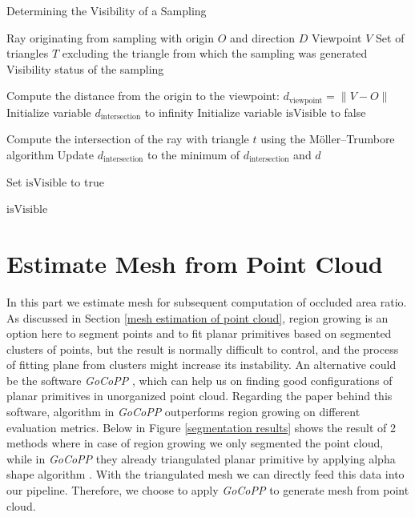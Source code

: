 \documentclass[11pt, a4paper,oneside,chapterprefix=false]{scrbook}
\begin{document}
\begin{algorithm}[H]
\caption{Determining the Visibility of a Sampling}\label{alg:visibility_sampling}
\begin{algorithmic}
\Require Ray originating from sampling with origin \( O \) and direction \( D \)
\Require Viewpoint \( V \)
\Require Set of triangles \( T \) excluding the triangle from which the sampling was generated
\Ensure Visibility status of the sampling

\State Compute the distance from the origin to the viewpoint: \( d_{\text{viewpoint}} = \| V - O \| \)
\State Initialize variable \( d_{\text{intersection}} \) to infinity
\State Initialize variable \( \text{isVisible} \) to false

    \State Compute the intersection of the ray with triangle \( t \) using the Möller–Trumbore algorithm
        \State Update \( d_{\text{intersection}} \) to the minimum of \( d_{\text{intersection}} \) and \( d \)
    \EndIf
\EndFor

    \State Set \( \text{isVisible} \) to true  
\EndIf

\State \Return \( \text{isVisible} \)
\end{algorithmic}
\end{algorithm}
 
\section{Estimate Mesh from Point Cloud} \label{sec:estimate mesh from point cloud}

In this part we estimate mesh for subsequent computation of occluded area ratio. As discussed in Section \ref{mesh estimation of point cloud}, region growing is an option here to segment points and to fit planar primitives based on segmented clusters of points, but the result is normally difficult to control, and the process of fitting plane from clusters might increase its instability. An alternative could be the software \emph{GoCoPP} \cite{YL:22}, which can help us on finding good configurations of planar primitives in unorganized point cloud. Regarding the paper behind this software, algorithm in \emph{GoCoPP} outperforms region growing on different evaluation metrics. Below in Figure \ref{segmentation results} shows the result of 2 methods where in case of region growing we only segmented the point cloud, while in \emph{GoCoPP} they already triangulated planar primitive by applying alpha shape algorithm \cite{Akkiraju:95}. With the triangulated mesh we can directly feed this data into our pipeline. Therefore, we choose to apply \emph{GoCoPP} to generate mesh from point cloud.
\end{document}
